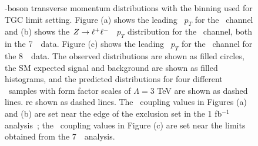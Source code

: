 \begin{figure}[htbp]
\begin{center}
\caption[\Z-boson transverse momentum distributions with the binning used for
TGC limit setting.]
{\Z-boson transverse momentum distributions with the binning used for
TGC limit setting.
Figure (a) shows the  leading \Z\ $p_T$ for the \ZZllll\ channel and (b) shows
the $Z\rightarrow\ell^+ \ell^-$ \Z\ $p_T$ distribution for the \ZZllvv\ channel, both in the
7~\tev\ data. Figure (c) shows the leading \Z\ $p_T$ for the \ZZllll\ channel
for the 8~\tev\ data.
The observed distributions are shown as filled circles,
the SM expected signal and background are shown as filled histograms, and the
predicted distributions for four different \TGC\ samples with form factor
 scales of $\Lambda=3$ TeV are shown as dashed lines.
re shown as dashed lines. The \TGC\ coupling values in Figures (a) and (b) are 
 set near the edge of the exclusion set in the 1 fb$^{-1}$
 analysis~\cite{ATLAS_ZZ4l:1fb2011}; the \TGC\ coupling values in Figure (c) are
 set near the limits obtained from the 7~\tev\ analysis.}
\label{fig:tgc-nicePlot}
\end{center}
\end{figure}

